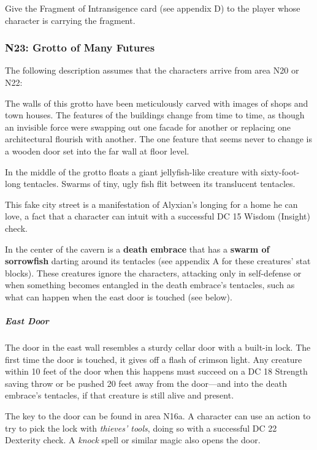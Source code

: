 \documentclass[10pt,a4paper,twoside,bg=print,twocolumn,openany,nodeprecatedcode]{dndbook}
\begin{document}
Give the Fragment of Intransigence card (see appendix D) to the player whose character is carrying the fragment.

\subsubsection{N23: Grotto of Many Futures}
The following description assumes that the characters arrive from area N20 or N22:

\begin{DndReadAloud}{}
The walls of this grotto have been meticulously carved with images of shops and town houses. The features of the buildings change from time to time, as though an invisible force were swapping out one facade for another or replacing one architectural flourish with another. The one feature that seems never to change is a wooden door set into the far wall at floor level.

In the middle of the grotto floats a giant jellyfish-like creature with sixty-foot-long tentacles. Swarms of tiny, ugly fish flit between its translucent tentacles.

\end{DndReadAloud}

This fake city street is a manifestation of Alyxian's longing for a home he can love, a fact that a character can intuit with a successful DC 15 Wisdom (Insight) check.

In the center of the cavern is a \textbf{death embrace} that has a \textbf{swarm of sorrowfish} darting around its tentacles (see appendix A for these creatures' stat blocks). These creatures ignore the characters, attacking only in self-defense or when something becomes entangled in the death embrace's tentacles, such as what can happen when the east door is touched (see below).

\subparagraph{East Door}
The door in the east wall resembles a sturdy cellar door with a built-in lock. The first time the door is touched, it gives off a flash of crimson light. Any creature within 10 feet of the door when this happens must succeed on a DC 18 Strength saving throw or be pushed 20 feet away from the door—and into the death embrace's tentacles, if that creature is still alive and present.

The key to the door can be found in area N16a. A character can use an action to try to pick the lock with \textit{thieves' tools}, doing so with a successful DC 22 Dexterity check. A \textit{knock} spell or similar magic also opens the door.
\end{document}

